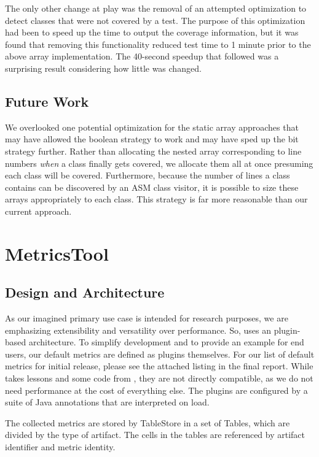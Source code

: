 The only other change at play was the removal of an attempted optimization to detect classes that were not covered by a test. The purpose of this optimization had been to speed up the time to output the coverage information, but it was found that removing this functionality reduced test time to 1 minute prior to the above array implementation. The 40-second speedup that followed was a surprising result considering how little was changed.

\subsection{Future Work}

We overlooked one potential optimization for the static array approaches that may have allowed the boolean strategy to work and may have sped up the bit strategy further. Rather than allocating the nested array corresponding to line numbers \textit{when} a class finally gets covered, we allocate them all at once presuming each class will be covered. Furthermore, because the number of lines a class contains can be discovered by an ASM class visitor, it is possible to size these arrays appropriately to each class. This strategy is far more reasonable than our current approach.

\section{MetricsTool}

\subsection{Design and Architecture}

As our imagined primary use case is intended for research purposes, we are emphasizing extensibility and versatility over performance. So, \mt{} uses an plugin-based architecture. To simplify development and to provide an example for end users, our default metrics are defined as plugins themselves. For our list of default metrics for initial release, please see the attached listing in the final report. While \mt{} takes lessons and some code from \ct{}, they are not directly compatible, as we do not need performance at the cost of everything else. The plugins are configured by a suite of Java annotations that are interpreted on load.

The collected metrics are stored by TableStore in a set of Tables, which are divided by the type of artifact. The cells in the tables are referenced by artifact identifier and metric identity.

